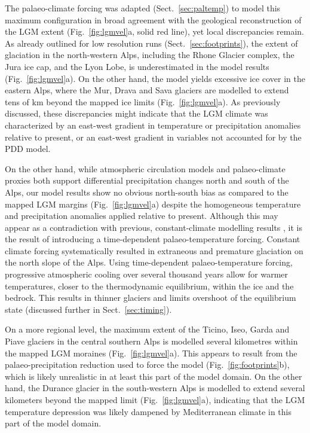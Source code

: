 \documentclass[tc, manuscript]{copernicus}
\begin{document}
    The palaeo-climate forcing was adapted (Sect.~\ref{sec:paltemp})
    to model this maximum configuration in broad agreement with the geological
    reconstruction of the LGM extent (Fig.~\ref{fig:lgmvel}a, solid red line),
    yet local discrepancies remain. As already outlined for low resolution
    runs (Sect.~\ref{sec:footprints}), the extent of glaciation in the
    north-western Alps, including the Rhone Glacier complex, the Jura ice cap,
    and the Lyon Lobe, is underestimated in the model results
    (Fig.~\ref{fig:lgmvel}a). On the other hand, the model yields excessive ice
    cover in the eastern Alps, where the Mur, Drava and Sava glaciers are
    modelled to extend tens of km beyond the mapped ice limits
    (Fig.~\ref{fig:lgmvel}a). As previously discussed, these discrepancies
    might indicate that the
    LGM climate was characterized by an east-west gradient in temperature
    \citep[cf.][]{Heyman.etal.2013} or precipitation
    \citep[cf.][]{Wu.etal.2007} anomalies relative to present, or an east-west
    gradient in variables not accounted for by the PDD model.

    On the other hand, while atmospheric circulation models
    \citep{Strandberg.etal.2011, Ludwig.etal.2016} and palaeo-climate proxies
    \citep{Luetscher.etal.2015} both support differential precipitation changes
    north and south of the Alps, our model results show no obvious north-south
    bias as compared to the mapped LGM margins (Fig.~\ref{fig:lgmvel}a) despite
    the homogeneous temperature and precipitation anomalies applied relative to
    present. Although this may appear as a contradiction with previous,
    constant-climate modelling results \citep{Becker.etal.2016}, it is the
    result of introducing a time-dependent palaeo-temperature forcing. Constant
    climate forcing systematically resulted in extraneous
    \citep[Fig.~3]{Becker.etal.2016} and premature
    \citep[Fig.~4]{Becker.etal.2016} glaciation on the north slope of the Alps.
    Using time-dependent palaeo-temperature forcing, progressive atmospheric
    cooling over several thousand years allow for warmer temperatures, closer to
    the thermodynamic equilibrium, within the ice and the bedrock. This results
    in thinner glaciers and limits overshoot of the equilibrium state
    (discussed further in Sect.~\ref{sec:timing}).

    On a more regional level, the maximum extent of the Ticino, Iseo,
    Garda and Piave glaciers in the central southern Alps is modelled
    several kilometres within the mapped LGM moraines (Fig.~\ref{fig:lgmvel}a).
    This appears to result
    from the palaeo-precipitation reduction used to force the model
    (Fig.~\ref{fig:footprints}b), which is likely unrealistic in at least this
    part of the model domain. On the other hand, the Durance glacier in the
    south-western Alps is modelled to extend several kilometers beyond the
    mapped limit (Fig.~\ref{fig:lgmvel}a), indicating that the LGM temperature
    depression was likely
    dampened by Mediterranean climate in this part of the model domain.
\end{document}
